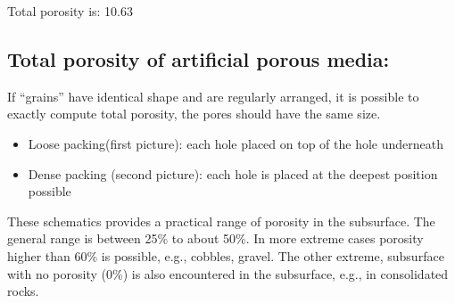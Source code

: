 \documentclass[letterpaper,10pt,english]{sphinxmanual}
\let\sphinxpxdimen\pdfpxdimen\else\newdimen\sphinxpxdimen
\begin{document}
\begin{sphinxVerbatim}[commandchars=\\\{\}]
  
 


 
\end{sphinxVerbatim}

\begin{sphinxVerbatim}[commandchars=\\\{\}]
 Total porosity is: 10.63\PYGZpc{}
\end{sphinxVerbatim}


\subsection{Total porosity of artificial porous media:}
\label{\detokenize{contents/flow/lecture_02/12_subsurface_structure:total-porosity-of-artificial-porous-media}}
If “grains” have identical shape and are regularly arranged, it is possible to exactly compute total porosity, the pores should have the same size.

\noindent\sphinxincludegraphics[width=300\sphinxpxdimen]{{L02_fig5}.png}
\begin{itemize}
\item {} 
Loose packing(first picture): each hole placed on top of the hole underneath

\item {} 
Dense packing (second picture): each hole is placed at the deepest position possible

\end{itemize}

These schematics provides a practical range of porosity in the subsurface. The general range is between 25\% to about 50\%. In more extreme cases porosity higher than 60\% is possible, e.g., cobbles, gravel. The other extreme, subsurface with no porosity (0\%) is also encountered in the subsurface, e.g., in consolidated rocks.
\end{document}
